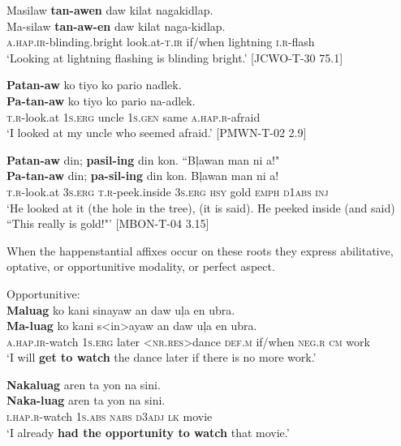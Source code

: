 \ea
Masilaw  \textbf{tan-awen}  daw  kilat  nagakidlap. \\\smallskip
\gll Ma-silaw  \textbf{tan-aw-en}  daw  kilat  naga-kidlap.\footnotemark{} \\
\textsc{a.hap.ir}-blinding.bright  look.at-\textsc{t.ir}  if/when  lightning  \textsc{i.r}-flash \\
\glt ‘Looking at lightning flashing is blinding bright.’ [JCWO-T-30 75.1]
\z

\ea
\textbf{Patan-aw}  ko  tiyo  ko  pario  nadlek. \\\smallskip
\gll \textbf{Pa-tan-aw}  ko  tiyo  ko  pario  na-adlek. \\
\textsc{t.r}-look.at  1\textsc{s.erg}  uncle  1\textsc{s.gen}  same  \textsc{a.hap.r}-afraid \\
\glt ‘I looked at my uncle who seemed afraid.’ [PMWN-T-02 2.9]
\z

\ea
\textbf{Patan-aw}  din;  \textbf{pasil-ing}  din  kon.  ``Bļawan  man  ni  a!" \\\smallskip
\gll \textbf{Pa-tan-aw}  din;  \textbf{pa-sil-ing}  din  kon.  Bļawan  man  ni  a! \\
\textsc{t.r}-look.at  3\textsc{s.erg}  \textsc{t.r}-peek.inside  3\textsc{s.erg}  \textsc{hsy}  gold  \textsc{emph}  \textsc{d1abs}  \textsc{inj} \\
\glt ‘He looked at it (the hole in the tree), (it is said). He peeked inside (and said) ``This really is gold!"’ [MBON-T-04 3.15]
\z

When the happenstantial affixes occur on these roots they express abilitative, optative, or opportunitive modality, or perfect aspect.

\ea
Opportunitive: \\
\textbf{Maluag}  ko  kani  sinayaw   an  daw  uļa  en  ubra. \\\smallskip
\gll \textbf{Ma-luag}  ko  kani  s<in>ayaw   an  daw  uļa  en  ubra. \\
\textsc{a.hap.ir}-watch  1\textsc{s.erg} later  <\textsc{nr.res}>dance  \textsc{def.m}  if/when  \textsc{neg.r} \textsc{cm}  work \\
\glt ‘I will \textbf{get to watch} the dance later if there is no more work.’
\z

\ea
\textbf{Nakaluag}  aren  ta  yon  na  sini. \\\smallskip
\gll \textbf{Naka-luag}  aren  ta  yon  na  sini. \\
\textsc{i.hap.r}-watch  1\textsc{s.abs}  \textsc{nabs}  \textsc{d3adj}  \textsc{lk}  movie \\
\glt ‘I already \textbf{had the opportunity to watch} that movie.’
\z

